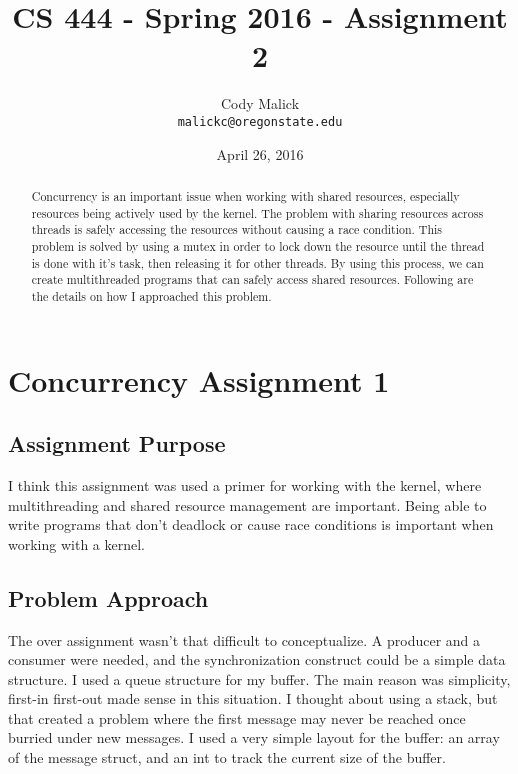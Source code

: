 \documentclass[10pt,letterpaper]{article}
\begin{document}
\begin{titlepage}
  \title{CS 444 - Spring 2016 - Assignment 2}
  \author{Cody Malick\\
  \texttt{malickc@oregonstate.edu}}
  \date{April 26, 2016}
  \maketitle
  \vspace*{2cm}
  \begin{abstract}
      \noindent Concurrency is an important issue when working with shared resources,
      especially resources being actively used by the kernel.
      The problem with sharing resources across threads is safely
      accessing the resources without causing a race condition. This problem is
      solved by using a mutex in order to lock down the resource until the thread
      is done with it's task, then releasing it for other threads. By using this
      process, we can create multithreaded programs that can safely access shared
      resources. Following are the details on how I approached this problem.
  \end{abstract}

\end{titlepage}

\tableofcontents
\clearpage

\section{Concurrency Assignment 1}
  \subsection{Assignment Purpose}
    I think this assignment was used a primer for working with the kernel, where
    multithreading and shared resource management are important. Being able to
    write programs that don't deadlock or cause race conditions is important
    when working with a kernel.
  \subsection{Problem Approach}
    The over assignment wasn't that difficult to conceptualize. A producer and
    a consumer were needed, and the synchronization construct could be a simple
    data structure.
    \noindent I used a queue structure for my buffer. The main reason was
    simplicity, first-in first-out made sense in this situation. I thought about
    using a stack, but that created a problem where the first message may never
    be reached once burried under new messages.
    \noindent I used a very simple layout for the buffer: an array of the message
    struct, and an int to track the current size of the buffer.
\end{document}
